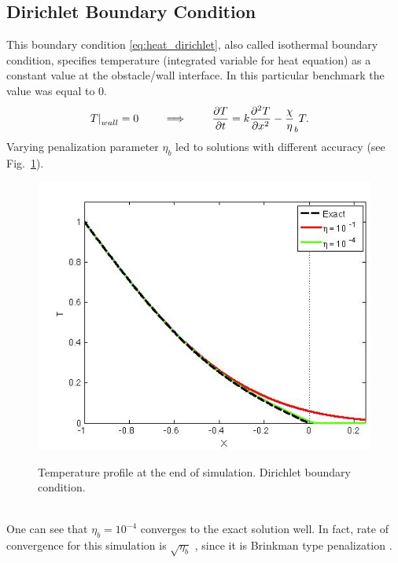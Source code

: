 \subsection{Dirichlet Boundary Condition}
This boundary condition \eqref{eq:heat_dirichlet}, also called isothermal boundary condition, specifies temperature (integrated variable for heat equation) as a constant value at the obstacle/wall interface. In this particular benchmark the value was equal to 0.
\begin{align}
\left.T\right|_{wall} = 0 \qquad \implies \qquad \frac {\partial T}{\partial t} &= k \frac {\partial^2 T}{\partial x^2} - \frac \chi \eta_b T. \label{eq:heat_dirichlet}
\end{align}
Varying penalization parameter $\eta_b$ led to solutions with different accuracy (see Fig.~\ref{fig:heat_dirichlet}).
\begin{figure}[h!]
\centering \includegraphics[scale=0.6]{fig/heat_dirichlet.png}\\
\caption{Temperature profile at the end of simulation. Dirichlet boundary condition. \label{fig:heat_dirichlet}}
\end{figure}\\
One can see that $\eta_b = 10^{-4}$ converges to the exact solution well. In fact, rate of convergence for this simulation is $\sqrt{\eta_b}$ \cite{ebd_nk_ovv_cbvp_jcp}, since it is Brinkman type penalization \cite{lib:vp_liu}.

